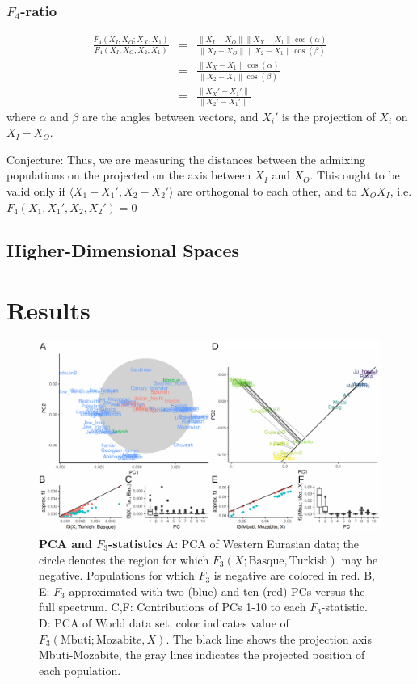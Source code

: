 \documentclass[12pt,a4pape, fullpage]{article}
\newcommand{\norm}[1]{\left\lVert#1\right\rVert}
\begin{document}
\subsubsection{$F_4$-ratio}
\begin{eqnarray}
\frac{F_4(X_I, X_O; X_X, X_1)}{F_4(X_I, X_O; X_2, X_1)} &=& \frac{\norm{X_I-X_O}\norm{X_X-X_1}\cos(\alpha)}{\norm{X_I-X_O}\norm{X_2-X_1}\cos(\beta)}\nonumber\\
&=&\frac{\norm{X_X-X_1}\cos(\alpha)}{\norm{X_2-X_1}\cos(\beta)}\nonumber\\
&=& \frac{\norm{X_X' - X_1'}}{\norm{X_2' - X_1'}}
\end{eqnarray}
where $\alpha$ and $\beta$ are the angles between vectors, and $X_i'$ is the projection of $X_i$ on $X_I-X_O$.

Conjecture: Thus, we are measuring the distances between the admixing populations on the projected on the axis between $X_I$ and $X_O$. This ought to be valid only if $\langle X_1 - X_1', X_2 - X_2' \rangle$ are orthogonal to each other, and to $X_OX_I$, i.e.
$F_4(X_1, X_1', X_2, X_2') = 0$
 
	
\subsection{Higher-Dimensional Spaces}


\section{Results}
\begin{figure}[!ht]
	\includegraphics[width=\textwidth]{figures/fig_f3_data.pdf}
	\caption{\textbf{PCA and $F_3$-statistics} A: PCA of Western Eurasian data; the circle denotes the region for which $F_3(X; \text{Basque}, \text{Turkish})$ may be negative. Populations for which $F_3$ is negative are colored in red. B, E: $F_3$ approximated with two (blue) and ten (red) PCs versus the full spectrum. C,F: Contributions of PCs 1-10 to each $F_3$-statistic. D: PCA of World data set, color indicates value of $F_3(\text{Mbuti}; \text{Mozabite}, X)$. The black line shows the projection axis Mbuti-Mozabite, the gray lines indicates the projected position of each population. }
	\label{fig:f3}
\end{figure}
\end{document}
